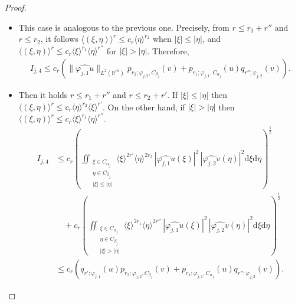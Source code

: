 \documentclass{amsart}
\theoremstyle{definition}
\begin{document}
\begin{proof}
\begin{itemize}
\begin{itemize}
\item[c) \underline{$r''<0\leq r'$:}]
This case is analogous to the previous one. Precisely, from $r\leq r_1+r''$ and $r\leq r_2$, it follows $\langle (\xi , \eta) \rangle^r \leq c_r \langle \eta \rangle^{r_2}$ when $| \xi| \leq |\eta|$, and $\langle (\xi , \eta) \rangle^r \leq c_r \langle \xi \rangle^{r_1} \langle \eta \rangle^{r''}$ for $| \xi| > |\eta|$. Therefore,
\begin{align*}
I_{j,4}
\leq c_r (\|\widehat{\varphi_{j,1} u}\|_{L^2(\mathbb{R}^m)}p_{r_2;\varphi_{j,2} , C_{\beta_j}} (v) +  p_{r_1;\varphi_{j,1},C_{\alpha_j}}(u)q_{r'' ; \varphi_{j,2}} (v)).
\end{align*}
\item[d) \underline{$r',r''<0$:}]
Then it holds $r\leq r_1 + r''$ and $r\leq r_2 + r'$. If $|\xi|\leq |\eta|$ then $\langle (\xi , \eta ) \rangle^{r} \leq c_r \langle \eta \rangle^{r_2} \langle \xi \rangle^{r'}$. On the other hand, if $|\xi| > |\eta|$ then $\langle (\xi , \eta ) \rangle^{r} \leq c_r \langle \xi \rangle^{r_1} \langle \eta \rangle^{r''}$.
\begin{align*}
I_{j,4}
& \leq c_r \left( \iint_{\substack{ \xi \in C_{\alpha_j} \\ \eta \in C_{\beta_j} \\ |\xi| \leq |\eta| }} \langle  \xi \rangle^{2r'} \langle  \eta \rangle^{2r_2} \, |\widehat{\varphi_{j,1} u} (\xi) |^2 \, | \widehat{\varphi_{j,2} v} (\eta)|^2 \mathrm{d}\xi \mathrm{d}\eta \right)^{\frac{1}{2}} \\
& \quad + c_r \left( \iint_{\substack{ \xi \in C_{\alpha_j} \\ \eta \in C_{\beta_j} \\ |\xi| > |\eta| }} \langle  \xi \rangle^{2r_1} \langle  \eta \rangle^{2r''} \, |\widehat{\varphi_{j,1} u} (\xi) |^2 \, | \widehat{\varphi_{j,2} v} (\eta)|^2 \mathrm{d}\xi \mathrm{d}\eta \right)^{\frac{1}{2}} \\
& \leq c_r (q_{r' ; \varphi_{j,1}} (u) p_{r_2; \varphi_{j,2} , C_{\beta_j}} (v) + p_{r_1; \varphi_{j,1} , C_{\alpha_j}} (u) q_{r'' ; \varphi_{j,2}} (v)) .
\end{align*}
\end{itemize}


\end{itemize}
\end{proof}
\end{document}
